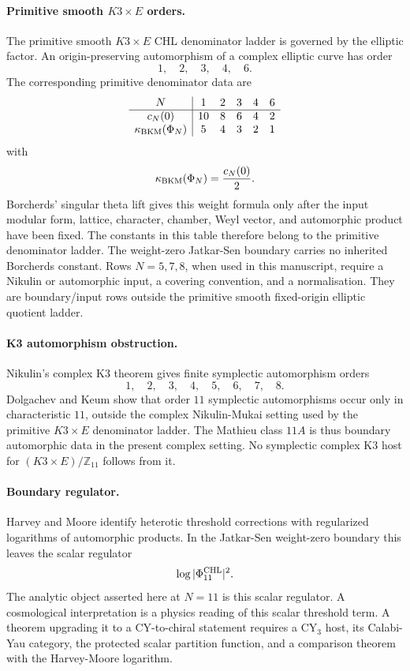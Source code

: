 \paragraph{Primitive smooth \(K3\times E\) orders.}
The primitive smooth \(K3\times E\) CHL denominator ladder is governed
by the elliptic factor. An origin-preserving automorphism of a complex
elliptic curve has order
\[
  1,\quad 2,\quad 3,\quad 4,\quad 6.
\]
The corresponding primitive denominator data are
\[
\begin{array}{c|ccccc}
N&1&2&3&4&6\\ \hline
c_N(0)&10&8&6&4&2\\
\kappa_{\mathrm{BKM}}(\Phi_N)&5&4&3&2&1
\end{array}
\]
with
\[
  \kappa_{\mathrm{BKM}}(\Phi_N)=\frac{c_N(0)}2.
\]
Borcherds' singular theta lift gives this weight formula only after
the input modular form, lattice, character, chamber, Weyl vector, and
automorphic product have been fixed. The constants in this table
therefore belong to the primitive denominator ladder. The weight-zero
Jatkar-Sen boundary carries no inherited Borcherds constant.
Rows \(N=5,7,8\), when used in this manuscript, require a Nikulin or
automorphic input, a covering convention, and a normalisation. They are
boundary/input rows outside the primitive smooth fixed-origin elliptic
quotient ladder.

\paragraph{K3 automorphism obstruction.}
Nikulin's complex K3 theorem gives finite symplectic automorphism
orders
\[
  1,\quad 2,\quad 3,\quad 4,\quad 5,\quad 6,\quad 7,\quad 8.
\]
Dolgachev and Keum show that order \(11\) symplectic automorphisms
occur only in characteristic \(11\), outside the complex Nikulin-Mukai
setting used by the primitive \(K3\times E\) denominator ladder. The
Mathieu class \(11A\) is thus boundary automorphic data in the present
complex setting. No symplectic complex K3 host for
\((K3\times E)/\mathbb Z_{11}\) follows from it.

\paragraph{Boundary regulator.}
Harvey and Moore identify heterotic threshold corrections with
regularized logarithms of automorphic products. In the Jatkar-Sen
weight-zero boundary this leaves the scalar regulator
\[
  \log|\Phi^{\mathrm{CHL}}_{11}|^2 .
\]
The analytic object asserted here at \(N=11\) is this scalar regulator.
A cosmological interpretation is a physics reading of this scalar
threshold term. A theorem upgrading it to a CY-to-chiral statement
requires a CY\(_3\) host, its Calabi-Yau category, the
protected scalar partition function, and a comparison theorem with the
Harvey-Moore logarithm.

